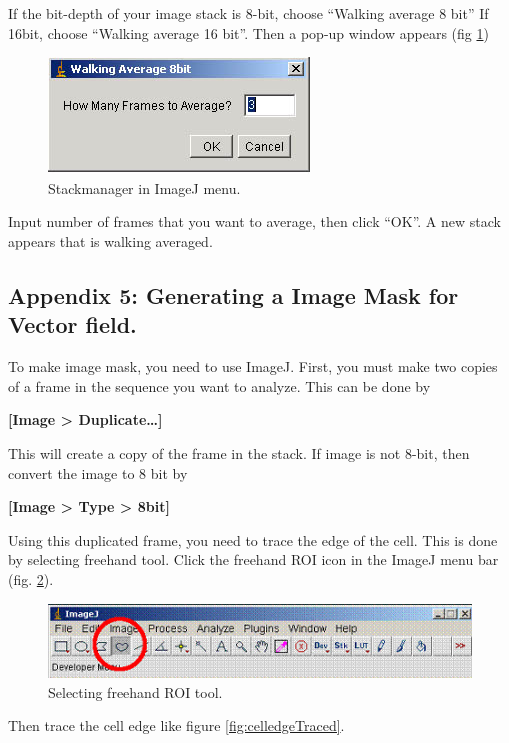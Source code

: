 \documentclass{article}
\begin{document}
If the bit-depth of your image stack is 8-bit, choose ``Walking average 8 bit'' If 16bit, choose ``Walking average 16 bit''. Then a pop-up window appears (fig \ref{fig:waparameters})

\begin{figure}[!ht]
\centering
\includegraphics[scale=0.6]{img/Stackmanager_waPOP.jpg}
\caption{Stackmanager in ImageJ menu.}
\label{fig:waparameters}
\end{figure}

Input number of frames that you want to average, then click ``OK''. A
new stack appears that is walking averaged.

\subsection{Appendix 5: Generating a Image Mask for Vector field.}

To make image mask, you need to use ImageJ. First, you must make two
copies of a frame in the sequence you want to analyze. This can be done
by

\textbf{{[}Image \textgreater{} Duplicate\ldots{}{]}}

This will create a copy of the frame in the stack. If image is not
8-bit, then convert the image to 8 bit by

\textbf{{[}Image \textgreater{} Type \textgreater{} 8bit{]}}

Using this duplicated frame, you need to trace the edge of the cell.
This is done by selecting freehand tool. Click the freehand ROI icon in
the ImageJ menu bar (fig. \ref{fig:freehandROIicon}).

\begin{figure}[!ht]
\centering
\includegraphics[scale=0.5]{img/image060.jpg}
\caption{Selecting freehand ROI tool.}
\label{fig:freehandROIicon}
\end{figure}

Then trace the cell edge like figure \ref{fig:celledgeTraced}.
\end{document}

